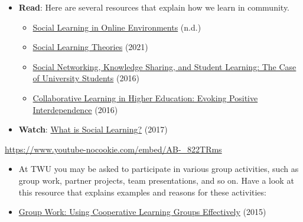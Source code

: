 \documentclass[
  letterpaper,
  DIV=11,
  numbers=noendperiod]{scrreprt}
\providecommand{\tightlist}{%
  \setlength{\itemsep}{0pt}\setlength{\parskip}{0pt}}\usepackage{longtable,booktabs,array}
\begin{document}
\begin{tcolorbox}[enhanced jigsaw, toprule=.15mm, colback=white, colframe=quarto-callout-note-color-frame, bottomtitle=1mm, leftrule=.75mm, coltitle=black, titlerule=0mm, rightrule=.15mm, colbacktitle=quarto-callout-note-color!10!white, left=2mm, title={Learning Activity}, opacitybacktitle=0.6, opacityback=0, breakable, toptitle=1mm, arc=.35mm, bottomrule=.15mm]

\begin{itemize}
\tightlist
\item
  \textbf{Read}: Here are several resources that explain how we learn in
  community.

  \begin{itemize}
  \tightlist
  \item
    \href{https://openpress.usask.ca/humanmooc/chapter/social-learning-in-online-environments/}{Social
    Learning in Online Environments} (n.d.)
  \item
    \href{https://socialsci.libretexts.org/Bookshelves/Education_and_Professional_Development/Teaching_Crowds_-_Learning_and_Social_Media_(Dron_and_Anderson)\%7Btarget=\%22_blank\%22\%7D/02\%3A_Social_Learning_Theories}{Social
    Learning Theories} (2021)
  \item
    \href{https://www.sciencedirect.com/science/article/abs/pii/S0360131516300872}{Social
    Networking, Knowledge Sharing, and Student Learning: The Case of
    University Students} (2016)
  \item
    \href{https://www.ncbi.nlm.nih.gov/pmc/articles/PMC5132366/}{Collaborative
    Learning in Higher Education: Evoking Positive Interdependence}
    (2016)
  \end{itemize}
\item
  \textbf{Watch}:
  \href{https://www.youtube.com/watch?v=AB-_822TRms}{What is Social
  Learning?} (2017)
\end{itemize}

\url{https://www.youtube-nocookie.com/embed/AB-_822TRms}

\begin{itemize}
\tightlist
\item
  At TWU you may be asked to participate in various group activities,
  such as group work, partner projects, team presentations, and so on.
  Have a look at this resource that explains examples and reasons for
  these activities:
\item
  \href{https://cft.vanderbilt.edu/guides-sub-pages/setting-up-and-facilitating-group-work-using-cooperative-learning-groups-effectively/}{Group
  Work: Using Cooperative Learning Groups Effectively} (2015)
\end{itemize}


\end{tcolorbox}
\end{document}
